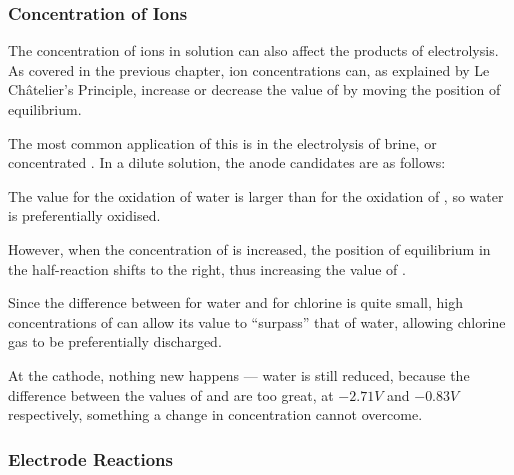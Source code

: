 

			\subsubsection{Concentration of Ions}

				The concentration of ions in solution can also affect the products of electrolysis. As covered in the previous chapter,
				ion concentrations can, as explained by Le Châtelier's Principle, increase or decrease the value of \Eo{} by moving
				the position of equilibrium.

				The most common application of this is in the electrolysis of brine, or concentrated . In a dilute solution,
				the anode candidates are as follows:


				The \Eox{} value for the oxidation of water is larger than for the oxidation of , so water is preferentially oxidised.

				However, when the concentration of \ch{\Cl-} is increased, the position of equilibrium in the half-reaction shifts to the
				right, thus increasing the value of \Eox{}.

				Since the difference between \Eox{} for water and for chlorine is quite small, high concentrations of \ch{\Cl-} can allow its
				\Eox{} value to \enquote{surpass} that of water, allowing chlorine gas to be preferentially discharged.

				At the cathode, nothing new happens --- water is still reduced, because the difference between the \Eo{} values of  and
				 are too great, at $-2.71V$ and $-0.83V$ respectively, something a change in concentration cannot overcome.




			\subsubsection{Electrode Reactions}


